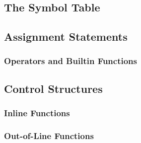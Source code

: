\documentclass[12pt]{article}
\begin{document}
\subsection{The Symbol Table}

\subsection{Assignment Statements}

\subsubsection{Operators and Builtin Functions}

\subsection{Control Structures}

\subsubsection{Inline Functions}

\subsubsection{Out-of-Line Functions}




\printindex
\end{document}
